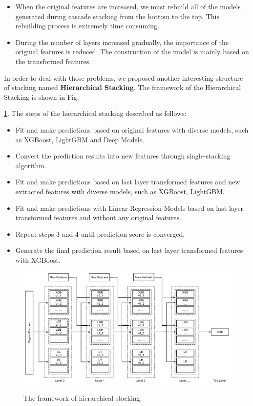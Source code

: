 \documentclass[12pt]{article}
\begin{document}
\begin{itemize}
\item[1.] When the original features are increased, we must rebuild all of the models generated during cascade stacking from the bottom to the top. This rebuilding process is extremely time consuming.
\item[2.] During the number of layers increased gradually, the importance of the original features is reduced. The construction of the model is mainly based on the transformed features. 
\end{itemize}

In order to deal with those problems, we proposed another interesting structure of stacking named \textbf{Hierarchical Stacking}. The framework of the Hierarchical Stacking  is shown in Fig.~{\ref{fig:hierarchical-stacking}. The steps of the hierarchical stacking described as follows:

\begin{itemize}
\label{alg:cascade-stacking}
\item[1.] Fit and make predictions based on original features with diverse models, such as XGBoost, LightGBM and Deep Models.
\item[2.] Convert the prediction results into new features through single-stacking algorithm.
\item[3.] Fit and make predictions based on last layer transformed features and new extracted features with diverse models, such as XGBoost, LightGBM.
\item[4.] Fit and make predictions with Linear Regression Models based on last layer transformed features and without any original features.
\item[5.] Repeat steps 3 and 4 until prediction score is converged.
\item[6.] Generate the final prediction result based on last layer transformed features with XGBoost.
\end{itemize}


\begin{figure}[ht]
  \centering
  \includegraphics[width=1.0\textwidth]{../img/hierarchical-stacking}\\
  \caption{The framework of hierarchical stacking.}
  \label{fig:hierarchical-stacking}
\end{figure}

}
\end{document}

